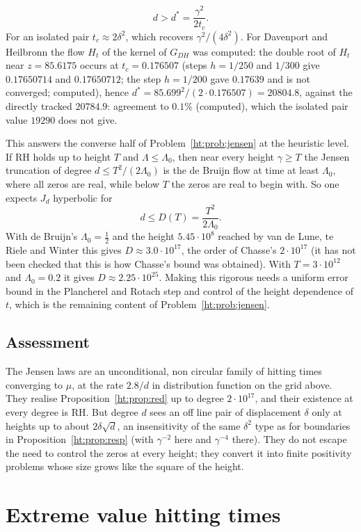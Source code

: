 \[
d>d^*=\frac{\gamma^2}{2t_c}.
\]
For an isolated pair $t_c\approx2\delta^2$, which recovers $\gamma^2/(4\delta^2)$. For Davenport and Heilbronn the flow $H_t$ of the kernel of $G_{DH}$ was computed: the double root of $H_t$ near $z=85.6175$ occurs at $t_c=0.176507$ (steps $h=1/250$ and $1/300$ give $0.17650714$ and $0.17650712$; the step $h=1/200$ gave $0.17639$ and is not converged; computed), hence $d^*=85.699^2/(2\cdot0.176507)=20804.8$, against the directly tracked $20784.9$: agreement to $0.1\%$ (computed), which the isolated pair value $19290$ does not give.

This answers the converse half of Problem~\ref{ht:prob:jensen} at the heuristic level. If RH holds up to height $T$ and $\Lambda\le\Lambda_0$, then near every height $\gamma\ge T$ the Jensen truncation of degree $d\le T^2/(2\Lambda_0)$ is the de Bruijn flow at time at least $\Lambda_0$, where all zeros are real, while below $T$ the zeros are real to begin with. So one expects $J_d$ hyperbolic for
\[
d\le D(T)=\frac{T^2}{2\Lambda_0}.
\]
With de Bruijn's $\Lambda_0=\frac12$ \cite{deBruijn} and the height $5.45\cdot10^8$ reached by van de Lune, te Riele and Winter \cite{LRW86} this gives $D\approx3.0\cdot10^{17}$, the order of Chasse's $2\cdot10^{17}$ (it has not been checked that this is how Chasse's bound was obtained). With $T=3\cdot10^{12}$ and $\Lambda_0=0.2$ \cite{PT21} it gives $D\approx2.25\cdot10^{25}$. Making this rigorous needs a uniform error bound in the Plancherel and Rotach step and control of the height dependence of $t$, which is the remaining content of Problem~\ref{ht:prob:jensen}.

\subsection{Assessment}
The Jensen laws are an unconditional, non circular family of hitting times converging to $\mu$, at the rate $2.8/d$ in distribution function on the grid above. They realise Proposition~\ref{ht:prop:red} up to degree $2\cdot10^{17}$, and their existence at every degree is RH. But degree $d$ sees an off line pair of displacement $\delta$ only at heights up to about $2\delta\sqrt d$, an insensitivity of the same $\delta^2$ type as for boundaries in Proposition~\ref{ht:prop:resp} (with $\gamma^{-2}$ here and $\gamma^{-4}$ there). They do not escape the need to control the zeros at every height; they convert it into finite positivity problems whose size grows like the square of the height.

\section{Extreme value hitting times}\label{ht:sec:ev}

